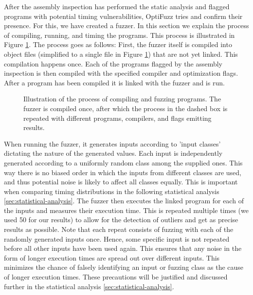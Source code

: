 After the assembly inspection has performed the static analysis and flagged programs with potential timing vulnerabilities, OptiFuzz tries and confirm their presence. 
For this, we have created a fuzzer.
In this section we explain the process of compiling, running, and timing the programs.
This process is illustrated in Figure \ref{fig:fuzzer-pipeline}.
The process goes as follows: 
First, the fuzzer itself is compiled into object files (simplified to a single file in Figure \ref{fig:fuzzer-pipeline}) that are not yet linked. 
This compilation happens once.
Each of the programs flagged by the assembly inspection is then compiled with the specified compiler and optimization flags.
After a program has been compiled it is linked with the fuzzer and is run.

\begin{figure}[H]
    \centering
    
    \caption{Illustration of the process of compiling and fuzzing programs. The fuzzer is compiled once, after which the process in the dashed box is repeated with different programs, compilers, and flags emitting results.}
    \label{fig:fuzzer-pipeline}
\end{figure}


When running the fuzzer, it generates inputs according to 'input classes' dictating the nature of the generated values.
Each input is independently generated according to a uniformly random class among the supplied ones.
This way there is no biased order in which the inputs from different classes are used, and thus potential noise is likely to affect all classes equally.
This is important when comparing timing distributions in the following statistical analysis \ref{sec:statistical-analysis}.
The fuzzer then executes the linked program for each of the inputs and measures their execution time.
This is repeated multiple times (we used 50 for our results) to allow for the detection of outliers and get as precise results as possible.
Note that each repeat consists of fuzzing with each of the randomly generated inputs once.
Hence, some specific input is not repeated before all other inputs have been used again. 
This ensures that any noise in the form of longer execution times are spread out over different inputs. 
This minimizes the chance of falsely identifying an input or fuzzing class as the cause of longer execution times.
These precautions will be justified and discussed further in the statistical analysis \ref{sec:statistical-analysis}.

